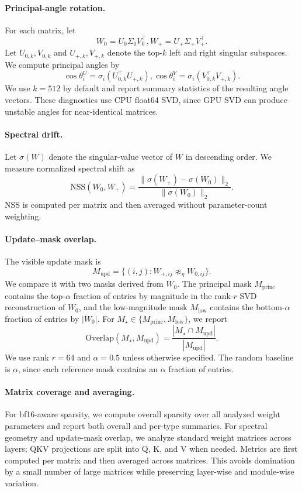 \documentclass{llmxive}
\begin{document}
\paragraph{Principal-angle rotation.}
For each matrix, let
\[
    W_0 = U_0\Sigma_0V_0^\top,
    W_+ = U_+\Sigma_+V_+^\top .
\]
Let $U_{0,k},V_{0,k}$ and $U_{+,k},V_{+,k}$ denote the top-$k$ left and
right singular subspaces. We compute principal angles by
\[
    \cos\theta_i^{U}
    =
    \sigma_i(U_{0,k}^{\top}U_{+,k}),
    \cos\theta_i^{V}
    =
    \sigma_i(V_{0,k}^{\top}V_{+,k}).
\]
We use $k=512$ by default and report summary statistics of the resulting
angle vectors. These diagnostics use CPU float64 SVD, since GPU SVD can
produce unstable angles for near-identical matrices.

\paragraph{Spectral drift.}
Let $\sigma(W)$ denote the singular-value vector of $W$ in descending
order. We measure normalized spectral shift as
\[
    \mathrm{NSS}(W_0,W_+)
    =
    \frac{
    \|\sigma(W_+) - \sigma(W_0)\|_2
    }{
    \|\sigma(W_0)\|_2
    }.
\]
NSS is computed per matrix and then averaged without parameter-count
weighting.

\paragraph{Update--mask overlap.}
The visible update mask is
\[
    M_{\mathrm{upd}}
    =
    \{(i,j): W_{+,ij}\not\approx_{\eta} W_{0,ij}\}.
\]
We compare it with two masks derived from $W_0$. The principal mask
$M_{\mathrm{princ}}$ contains the top-$\alpha$ fraction of entries by
magnitude in the rank-$r$ SVD reconstruction of $W_0$, and the
low-magnitude mask $M_{\mathrm{low}}$ contains the bottom-$\alpha$ fraction
of entries by $|W_0|$. For
$M_\star\in\{M_{\mathrm{princ}},M_{\mathrm{low}}\}$, we report
\[
    \mathrm{Overlap}(M_\star,M_{\mathrm{upd}})
    =
    \frac{|M_\star\cap M_{\mathrm{upd}}|}
    {|M_{\mathrm{upd}}|}.
\]
We use rank $r=64$ and $\alpha=0.5$ unless otherwise specified. The random
baseline is $\alpha$, since each reference mask contains an $\alpha$
fraction of entries.

\paragraph{Matrix coverage and averaging.}
For bf16-aware sparsity, we compute overall sparsity over all analyzed
weight parameters and report both overall and per-type summaries. For
spectral geometry and update-mask overlap, we analyze standard weight
matrices across layers; QKV projections are split into Q, K, and V when
needed. Metrics are first computed per matrix and then averaged across
matrices. This avoids domination by a small number of large matrices while
preserving layer-wise and module-wise variation.
\end{document}
